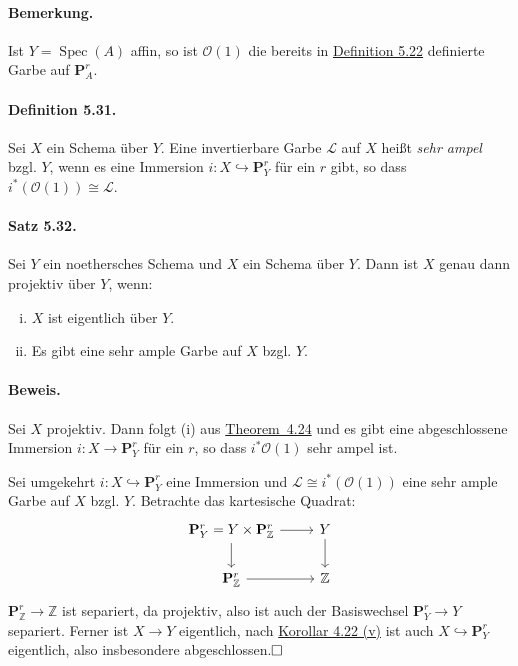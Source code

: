 \documentclass[11pt,b5paper,openany]{memoir}
\def \qed {$\hfill\square$}
\begin{document}
\paragraph{Bemerkung.} Ist $Y=\operatorname{Spec}(A)$ affin, so ist $\mathcal{O}(1)$ die bereits in \hyperref[5.22]{Definition 5.22} definierte Garbe auf $\mathbf{P}_A^r$.

\paragraph{Definition 5.31.}\label{5.31} Sei $X$ ein Schema über $Y$. Eine invertierbare Garbe $\mathcal{L}$ auf $X$ heißt \textit{sehr ampel} bzgl. $Y$, wenn es eine Immersion $i:X\hookrightarrow\mathbf{P}_Y^r$ für ein $r$ gibt, so dass $i^\ast(\mathcal{O}(1))\cong\mathcal{L}$.

\paragraph{Satz 5.32.}\label{5.32} Sei $Y$ ein noethersches Schema und $X$ ein Schema über $Y$. Dann ist $X$ genau dann projektiv über $Y$, wenn:
\begin{enumerate}[(i)]
\item $X$ ist eigentlich über $Y$.
\item Es gibt eine sehr ample Garbe auf $X$ bzgl. $Y$.
\end{enumerate}

\paragraph{Beweis.} Sei $X$ projektiv. Dann folgt (i) aus \hyperref[4.24]{Theorem~4.24} und es gibt eine abgeschlossene Immersion $i:X\to\mathbf{P}_Y^r$ für ein $r$, so dass $i^\ast\mathcal{O}(1)$ sehr ampel ist.

Sei umgekehrt $i:X\hookrightarrow\mathbf{P}_Y^r$ eine Immersion und $\mathcal{L}\cong i^\ast(\mathcal{O}(1))$ eine sehr ample Garbe auf $X$ bzgl. $Y$. Betrachte das kartesische Quadrat:
\[\begin{tikzcd}
\mathbf{P}^r_Y = Y\times \mathbf{P}_\mathbb{Z}^r \ar[r]\ar[d]& Y\ar[d]\\
\mathbf{P}_\mathbb{Z}^r\ar[r] & \mathbb{Z}
\end{tikzcd} \]
$\mathbf{P}_\mathbb{Z}^r\to\mathbb{Z}$ ist separiert, da projektiv, also ist auch der Basiswechsel $\mathbf{P}_Y^r\to Y$ separiert. Ferner ist $X\to Y$ eigentlich, nach \hyperref[4.22]{Korollar 4.22 (v)} ist auch $X\hookrightarrow \mathbf{P}_Y^r$ eigentlich, also insbesondere abgeschlossen.\qed
\end{document}

